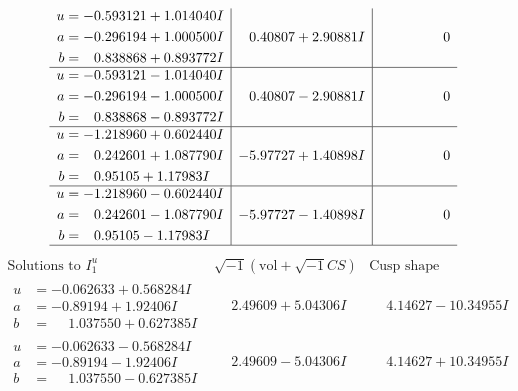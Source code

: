 \documentclass[1p]{elsarticle_modified}
\theoremstyle{definition}
\newcommand{\I}{\sqrt{-1}}
\begin{document}
$$\begin{array}{c|c|c}
\begin{aligned}
u &= -0.593121 + 1.014040 I \\
a &= -0.296194 + 1.000500 I \\
b &= \phantom{-}0.838868 + 0.893772 I\end{aligned}
 & \phantom{-}0.40807 + 2.90881 I & \phantom{-0.000000 } 0 \\ \hline\begin{aligned}
u &= -0.593121 - 1.014040 I \\
a &= -0.296194 - 1.000500 I \\
b &= \phantom{-}0.838868 - 0.893772 I\end{aligned}
 & \phantom{-}0.40807 - 2.90881 I & \phantom{-0.000000 } 0 \\ \hline\begin{aligned}
u &= -1.218960 + 0.602440 I \\
a &= \phantom{-}0.242601 + 1.087790 I \\
b &= \phantom{-}0.95105 + 1.17983 I\end{aligned}
 & -5.97727 + 1.40898 I & \phantom{-0.000000 } 0 \\ \hline\begin{aligned}
u &= -1.218960 - 0.602440 I \\
a &= \phantom{-}0.242601 - 1.087790 I \\
b &= \phantom{-}0.95105 - 1.17983 I\end{aligned}
 & -5.97727 - 1.40898 I & \phantom{-0.000000 } 0\\
 \hline 
 \end{array}$$\newpage$$\begin{array}{c|c|c}  
\text{Solutions to }I^u_{1}& \I (\text{vol} + \sqrt{-1}CS) & \text{Cusp shape}\\
 \hline 
\begin{aligned}
u &= -0.062633 + 0.568284 I \\
a &= -0.89194 + 1.92406 I \\
b &= \phantom{-}1.037550 + 0.627385 I\end{aligned}
 & \phantom{-}2.49609 + 5.04306 I & \phantom{-}4.14627 - 10.34955 I \\ \hline\begin{aligned}
u &= -0.062633 - 0.568284 I \\
a &= -0.89194 - 1.92406 I \\
b &= \phantom{-}1.037550 - 0.627385 I\end{aligned}
 & \phantom{-}2.49609 - 5.04306 I & \phantom{-}4.14627 + 10.34955 I \\ \hline\begin{aligned}

\end{aligned}
\end{array}$$
\end{document}
